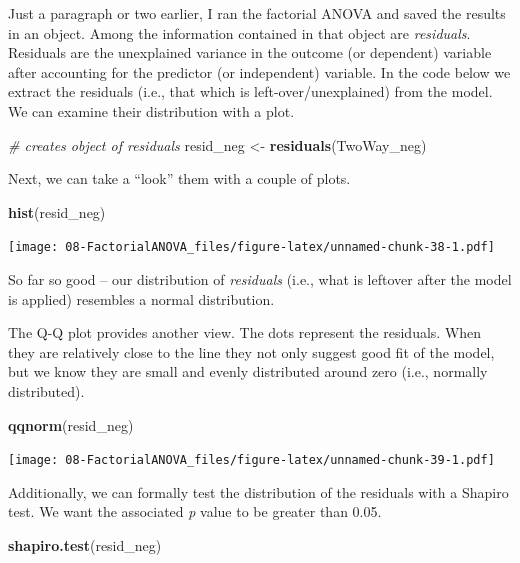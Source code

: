 \documentclass[
  11pt,
]{book}
\newenvironment{Shaded}{\begin{snugshade}}{\end{snugshade}}
\newcommand{\CommentTok}[1]{\textcolor[rgb]{0.37,0.37,0.37}{\textit{#1}}}
\newcommand{\FunctionTok}[1]{\textcolor[rgb]{0.27,0.27,0.27}{\textbf{#1}}}
\newcommand{\NormalTok}[1]{#1}
\newcommand{\OtherTok}[1]{\textcolor[rgb]{0.37,0.37,0.37}{#1}}
\begin{document}
Just a paragraph or two earlier, I ran the factorial ANOVA and saved the results in an object. Among the information contained in that object are \emph{residuals}. Residuals are the unexplained variance in the outcome (or dependent) variable after accounting for the predictor (or independent) variable. In the code below we extract the residuals (i.e., that which is left-over/unexplained) from the model. We can examine their distribution with a plot.

\begin{Shaded}
\begin{Highlighting}[]
\CommentTok{\# creates object of residuals}
\NormalTok{resid\_neg }\OtherTok{\textless{}{-}} \FunctionTok{residuals}\NormalTok{(TwoWay\_neg)}
\end{Highlighting}
\end{Shaded}

Next, we can take a ``look'' them with a couple of plots.

\begin{Shaded}
\begin{Highlighting}[]
\FunctionTok{hist}\NormalTok{(resid\_neg)}
\end{Highlighting}
\end{Shaded}

\texttt{[image: 08-FactorialANOVA\_files/figure-latex/unnamed-chunk-38-1.pdf]}

So far so good -- our distribution of \emph{residuals} (i.e., what is leftover after the model is applied) resembles a normal distribution.

The Q-Q plot provides another view. The dots represent the residuals. When they are relatively close to the line they not only suggest good fit of the model, but we know they are small and evenly distributed around zero (i.e., normally distributed).

\begin{Shaded}
\begin{Highlighting}[]
\FunctionTok{qqnorm}\NormalTok{(resid\_neg)}
\end{Highlighting}
\end{Shaded}

\texttt{[image: 08-FactorialANOVA\_files/figure-latex/unnamed-chunk-39-1.pdf]}

Additionally, we can formally test the distribution of the residuals with a Shapiro test. We want the associated \emph{p} value to be greater than 0.05.

\begin{Shaded}
\begin{Highlighting}[]
\FunctionTok{shapiro.test}\NormalTok{(resid\_neg)}
\end{Highlighting}
\end{Shaded}
\end{document}
